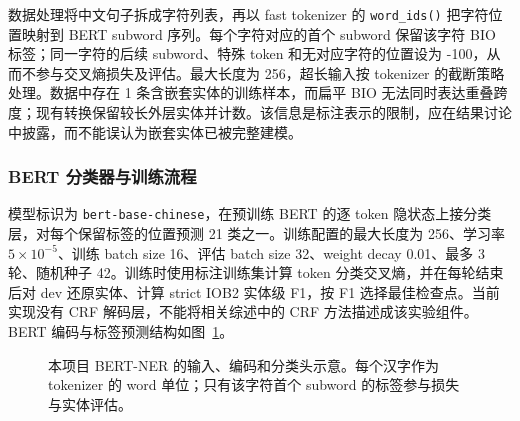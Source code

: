 \documentclass[UTF8,a4paper,12pt,fontset=none]{ctexart}
\begin{document}
数据处理将中文句子拆成字符列表，再以 fast tokenizer 的 \texttt{word\_ids()} 把字符位置映射到 BERT subword 序列。每个字符对应的首个 subword 保留该字符 BIO 标签；同一字符的后续 subword、特殊 token 和无对应字符的位置设为 -100，从而不参与交叉熵损失及评估。最大长度为 256，超长输入按 tokenizer 的截断策略处理。数据中存在 1 条含嵌套实体的训练样本，而扁平 BIO 无法同时表达重叠跨度；现有转换保留较长外层实体并计数。该信息是标注表示的限制，应在结果讨论中披露，而不能误认为嵌套实体已被完整建模。

\subsubsection{BERT 分类器与训练流程}
模型标识为 \texttt{bert-base-chinese}，在预训练 BERT 的逐 token 隐状态上接分类层，对每个保留标签的位置预测 21 类之一。训练配置的最大长度为 256、学习率 $5\times10^{-5}$、训练 batch size 16、评估 batch size 32、weight decay 0.01、最多 3 轮、随机种子 42。训练时使用标注训练集计算 token 分类交叉熵，并在每轮结束后对 dev 还原实体、计算 strict IOB2 实体级 F1，按 F1 选择最佳检查点。当前实现没有 CRF 解码层，不能将相关综述中的 CRF 方法描述成该实验组件\cite{bert}。BERT 编码与标签预测结构如图~\ref{fig:bert-architecture}。

\begin{figure}[htbp]
  \centering
  \caption{本项目 BERT-NER 的输入、编码和分类头示意。每个汉字作为 tokenizer 的 word 单位；只有该字符首个 subword 的标签参与损失与实体评估。}
  \label{fig:bert-architecture}
\end{figure}
\end{document}

